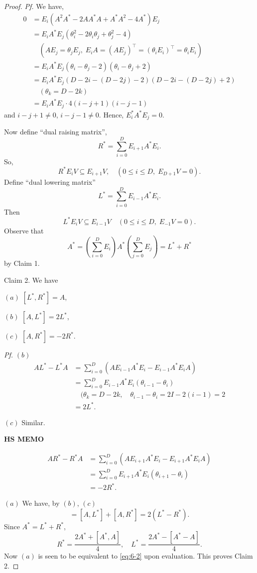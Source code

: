 \documentclass[
]{book}
\theoremstyle{definition}
\theoremstyle{definition}
\theoremstyle{definition}
\theoremstyle{definition}
\theoremstyle{remark}
\begin{document}
\begin{proof}
\emph{Pf.} We have,
\begin{align}
0 & = E_i(A^2A^* - 2AA^*A + A^*A^2 - 4A^*)E_j\\
& = E_iA^*E_j(\theta_i^2 - 2\theta_i\theta_j + \theta_j^2 - 4)\\
& \quad (AE_j = \theta_jE_j, \; E_iA = (AE_j)^\top = (\theta_iE_i)^\top = \theta_iE_i)\\
& = E_iA^*E_j(\theta_i - \theta_j -2)(\theta_i - \theta_j + 2)\\
& = E_iA^*E_j(D-2i - (D-2j)-2)(D-2i - (D-2j) + 2)\\
& \quad (\theta_k = D-2k)\\
& = E_iA^*E_j \cdot 4(i-j+1)(i-j-1)
\end{align}
and \(i-j+1 \neq 0\), \(i-j-1\neq 0\).
Hence, \(E_i^*A^*E_j = 0\).

Now define ``dual raising matrix'',
\[R^* = \sum_{i=0}^D E_{i+1}A^*E_i.\]
So,
\[R^*E_iV \subseteq E_{i+1}V, \quad (0\leq i\leq D, \; E_{D+1}V = 0).\]
Define ``dual lowering matrix''
\[L^* = \sum_{i=0}^D E_{i-1}A^*E_i.\]
Then
\[L^*E_iV \subseteq E_{i-1}V \quad (0\leq i\leq D, \; E_{-1}V = 0).\]
Observe that
\[A^* = \left(\sum_{i=0}^DE_i\right)A^*\left(\sum_{j=0}^DE_j\right) = L^* + R^*\]
by Claim 1.

Claim 2. We have

\((a)\) \([L^*, R^*] = A\),

\((b)\) \([A, L^*] = 2L^*\),

\((c)\) \([A, R^*] = -2R^*\).

\emph{Pf.}
\((b)\)
\begin{align}
AL^* - L^*A & = \sum_{i=0}^D(AE_{i-1}A^*E_i - E_{i-1}A^*E_iA)\\
& = \sum_{i=0}^D E_{i-1}A^*E_i (\theta_{i-1} - \theta_i)\\
& \quad (\theta_k = D-2k, \quad \theta_{i-1}- \theta_i = 2I - 2(i-1) = 2\\
& = 2L^*.
\end{align}

\((c)\) Similar.

\textbf{HS MEMO}

\begin{align}
AR^* - R^*A & = \sum_{i=0}^D (AE_{i+1}A^*E_i - E_{i+1}A^*E_iA)\\
& = \sum_{i=0}^D E_{i+1}A^*E_i (\theta_{i+1} - \theta_i)\\
& = -2R^*.
\end{align}

\((a)\) We have, by \((b)\), \((c)\)
\begin{equation}
[A, A^*] = [A, L^*] + [A, R^*] = 2(L^* - R^*).
\end{equation}
Since \(A^* = L^* + R^*\),
\[R^* = \frac{2A^* + [A^*, A]}{4}, \quad L^* = \frac{2A^* - [A^* - A]}{4}.\]
Now \((a)\) is seen to be equivalent to \eqref{eq:6-2} upon evaluation.
This proves Claim 2.


\end{proof}
\end{document}
